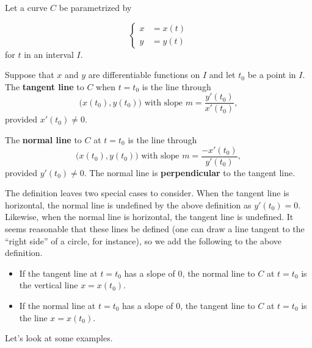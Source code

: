\documentclass{ximera}
\begin{document}
\begin{definition}
Let a curve $C$ be parametrized by 

\[ 
\begin{cases}
x&=x(t) \\
y&=y(t)
\end{cases}
\]
for $t$ in an interval $I$. 

Suppose that $x$ and $y$ are differentiable functions on $I$ and let $t_{0}$ be a point in $I$. The \textbf{tangent line} to $C$ when $t=t_0$ is the line through
\[
\big(x(t_0),y(t_0)\big)\text{ with slope }m=\frac{y'(t_0)}{x'(t_0)},
\]
provided $x'(t_0)\neq 0$.

The \textbf{normal line} to $C$ at $t=t_0$ is the line through 
\[
\big(x(t_0),y(t_0)\big)\text{ with slope }m=\frac{-x'(t_0)}{y'(t_0)},
\]
provided $y'(t_0)\neq 0$.  The normal line is \textbf{perpendicular}
to the tangent line.
\end{definition}

The definition leaves two special cases to consider. When the tangent
line is horizontal, the normal line is undefined by the above
definition as $y'(t_0)=0$. Likewise, when the normal line is
horizontal, the tangent line is undefined. It seems reasonable that
these lines be defined (one can draw a line tangent to the ``right
side'' of a circle, for instance), so we add the following to the
above definition.

\begin{itemize}
\item If the tangent line at $t=t_0$ has a slope of $0$, the normal
  line to $C$ at $t=t_0$ is the vertical line $x=x(t_0)$.
\item If the normal line at $t=t_0$ has a slope of $0$, the tangent
  line to $C$ at $t=t_0$ is the line $x=x(t_0)$.
\end{itemize}

Let's look at some examples. 
\end{document}
